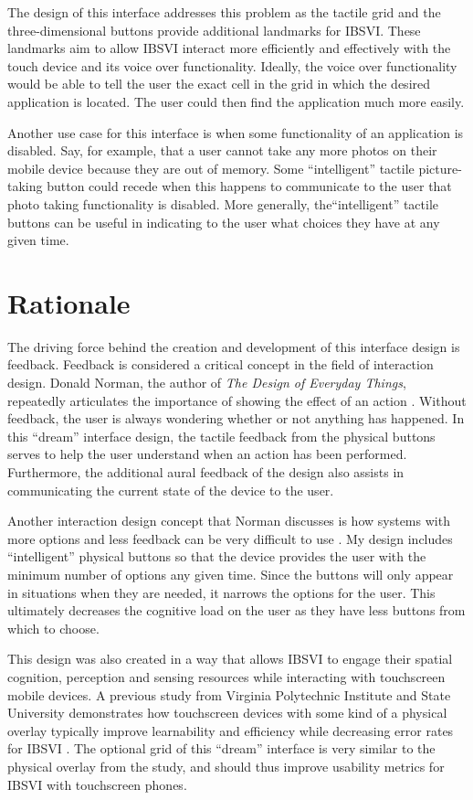 \documentclass[11pt]{article}
\begin{document}
The design of this interface addresses this problem as the tactile grid and the three-dimensional buttons provide additional landmarks for IBSVI. These landmarks aim to allow IBSVI interact more efficiently and effectively with the touch device and its voice over functionality. Ideally, the voice over functionality would be able to tell the user the exact cell in the grid in which the desired application is located. The user could then find the application much more easily.

Another use case for this interface is when some functionality of an application is disabled. Say, for example, that a user cannot take any more photos on their mobile device because they are out of memory. Some ``intelligent'' tactile picture-taking button could recede when this happens to communicate to the user that photo taking functionality is disabled. More generally, the``intelligent'' tactile buttons can be useful in indicating to the user what choices they have at any given time.

\section{Rationale}
The driving force behind the creation and development of this interface design is feedback. Feedback is considered a critical concept in the field of interaction design. Donald Norman, the author of \textit{The Design of Everyday Things}, repeatedly articulates the importance of showing the effect of an action \cite{Norman02}. Without feedback, the user is always wondering whether or not anything has happened. In this ``dream'' interface design, the tactile feedback from the physical buttons serves to help the user understand when an action has been performed. Furthermore, the additional aural feedback of the design also assists in communicating the current state of the device to the user.

Another interaction design concept that Norman discusses is how systems with more options and less feedback can be very difficult to use \cite{Norman02}. My design includes ``intelligent'' physical buttons so that the device provides the user with the minimum number of options any given time. Since the buttons will only appear in situations when they are needed, it narrows the options for the user. This ultimately decreases the cognitive load on the user as they have less buttons from which to choose.

This design was also created in a way that allows IBSVI to engage their spatial cognition, perception and sensing resources while interacting with touchscreen mobile devices. A previous study from Virginia Polytechnic Institute and State University demonstrates how touchscreen devices with some kind of a physical overlay typically improve learnability and efficiency while decreasing error rates for IBSVI \cite{El-Glaly:2013:TTF:2460625.2460665}. The optional grid of this ``dream'' interface is very similar to the physical overlay from the study, and should thus improve usability metrics for IBSVI with touchscreen phones.
\end{document}
